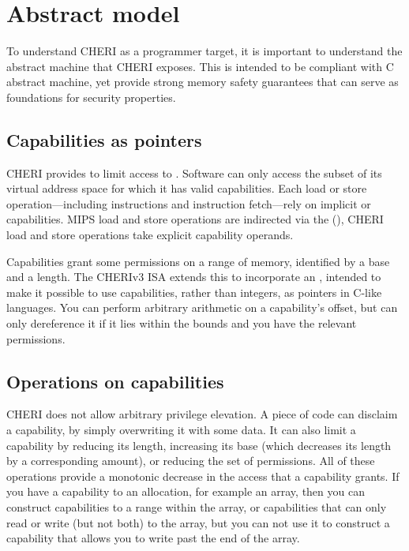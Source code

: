 \chapter{Abstract model}
\label{chap:abstract-model}

To understand CHERI as a programmer target, it is important to understand the abstract machine that CHERI exposes.  This is intended to be compliant with C abstract machine, yet provide strong memory safety guarantees that can serve as foundations for security properties.

\section{Capabilities as pointers}

CHERI provides  to limit access to .  Software can only access the subset of its virtual address space for which it has valid capabilities.  Each load or store operation---including instructions and instruction fetch---rely on implicit or capabilities.  MIPS load and store operations are indirected via the  (), CHERI load and store operations take explicit capability operands.

Capabilities grant some permissions on a range of memory, identified by a base and a length.  The CHERIv3 ISA extends this to incorporate an , intended to make it possible to use capabilities, rather than integers, as pointers in C-like languages.  You can perform arbitrary arithmetic on a capability's offset, but can only dereference it if it lies within the bounds and you have the relevant permissions.

\section{Operations on capabilities}

CHERI does not allow arbitrary privilege elevation.  A piece of code can disclaim a capability, by simply overwriting it with some data.  It can also limit a capability by reducing its length, increasing its base (which decreases its length by a corresponding amount), or reducing the set of permissions.  All of these operations provide a monotonic decrease in the access that a capability grants.  If you have a capability to an allocation, for example an array, then you can construct capabilities to a range within the array, or capabilities that can only read or write (but not both) to the array, but you can not use it to construct a capability that allows you to write past the end of the array.

